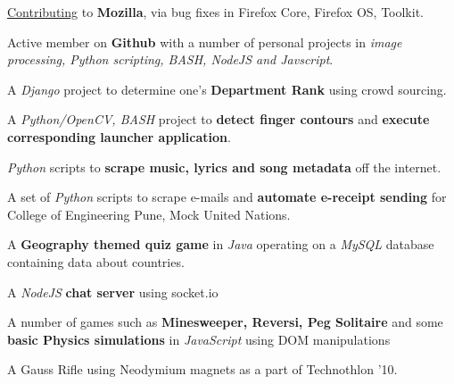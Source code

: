\documentclass[11pt]{resume}
\begin{document}
\begin{resume}
\begin{list2}
\item \href{httpss://bugzilla.mozilla.org/user_profile?login=kalpeshk2011\%40gmail.com}{Contributing} to \textbf{Mozilla}, via bug fixes in Firefox Core, Firefox OS, Toolkit.
\item Active member on \textbf{Github} with a number of personal projects in \textsl{image processing, Python scripting, BASH, NodeJS and Javscript}.
\item A \textsl{Django} project to determine one's \textbf{Department Rank} using crowd sourcing.
\item A \textsl{Python/OpenCV, BASH} project to \textbf{detect finger contours} and \textbf{execute corresponding launcher application}.
\item \textsl{Python} scripts to \textbf{scrape music, lyrics and song metadata} off the internet.
\item A set of \textsl{Python} scripts to scrape e-mails and \textbf{automate e-receipt sending} for College of Engineering Pune, Mock United Nations.

\item A \textbf{Geography themed quiz game} in \textsl{Java} operating on a \textsl{MySQL} database containing data about countries.
\item A \textsl{NodeJS} \textbf{chat server} using socket.io
\item A number of games such as \textbf{Minesweeper, Reversi, Peg Solitaire} and some \textbf{basic Physics simulations} in \textsl{JavaScript} using DOM manipulations
\item A Gauss Rifle using Neodymium magnets as a part of Technothlon '10.
\end{list2}

\end{resume}
\end{document}
